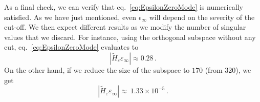 As a final check, we can verify that eq.~\eqref{eq:EpsilonZeroMode} is
numerically satisfied. As we have just mentioned, even $\epsilon_{\infty}$ will depend
on the severity of the cut-off. We then expect different results as we modify the
number of singular values that we discard. For instance, using the orthogonal
subspace without any cut, eq.~\eqref{eq:EpsilonZeroMode} evaluates to
\begin{equation}
  \left| \tilde{H}_{\varepsilon} \varepsilon_{\infty} \right| \approx 0.28 \,.
\end{equation}
On the other hand, if we reduce the size of the subspace to $170$ (from 320), we
get
\begin{equation}
  \left| \tilde{H}_{\varepsilon} \varepsilon_{\infty} \right| \approx ~1.33 \times 10^{-5} \,.
\end{equation}

